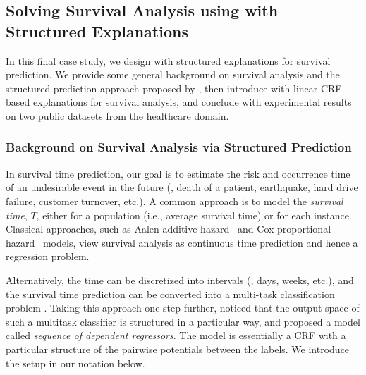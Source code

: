 \documentclass[twoside,11pt]{article}
\begin{document}
\subsection{Solving Survival Analysis using {\CEN} with Structured Explanations}
\label{sec:applications-survival-analysis}

In this final case study, we design {\CENs} with structured explanations for survival prediction.
We provide some general background on survival analysis and the structured prediction approach proposed by \citet{lin2011learning}, then introduce {\CENs} with linear CRF-based explanations for survival analysis, and conclude with experimental results on two public datasets from the healthcare domain.

\subsubsection{Background on Survival Analysis via Structured Prediction}
\label{sec:survival-analysis-background}

In survival time prediction, our goal is to estimate the risk and occurrence time of an undesirable event in the future (\eg, death of a patient, earthquake, hard drive failure, customer turnover, etc.).
A common approach is to model the \emph{survival time}, $T$, either for a population (i.e., average survival time) or for each instance.
Classical approaches, such as Aalen additive hazard~\citep{aalen} and Cox proportional hazard~\citep{cox} models, view survival analysis as continuous time prediction and hence a regression problem.

Alternatively, the time can be discretized into intervals (\eg, days, weeks, etc.), and the survival time prediction can be converted into a multi-task classification problem \citep{efron1988logistic}.
Taking this approach one step further, \citet{lin2011learning} noticed that the output space of such a multitask classifier is structured in a particular way, and proposed a model called \emph{sequence of dependent regressors}.
The model is essentially a CRF with a particular structure of the pairwise potentials between the labels.
We introduce the setup in our notation below.
\end{document}
